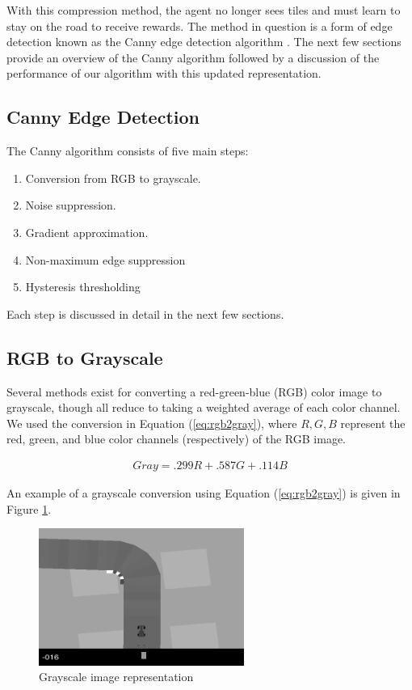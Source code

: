 With this compression method, the
agent no longer sees tiles and must learn to stay on the road to receive rewards.
The method in question is a form of edge detection known as the Canny edge 
detection algorithm \cite{canny}. The next few sections provide an overview
of the Canny algorithm followed by a discussion of the 
performance of our
algorithm with this updated representation.

\newpage
\subsection{Canny Edge Detection}
The Canny algorithm consists of five main steps:

\begin{enumerate}[1.]
\item{Conversion from RGB to grayscale.}
\item{Noise suppression.}
\item{Gradient approximation.}
\item{Non-maximum edge suppression}
\item{Hysteresis thresholding}
\end{enumerate}

Each step is discussed in detail in the next few sections.

\subsection{RGB to Grayscale}
Several methods exist for converting a
red-green-blue (RGB) color image to grayscale, though
all reduce to taking a weighted average of each color channel. We used the 
conversion in Equation (\ref{eq:rgb2gray}), where $R,G,B$ represent the
red, green, and blue color channels (respectively) of the RGB image. 

\begin{align}\label{eq:rgb2gray}
Gray = .299R + .587G + .114B
\end{align}

An example of a grayscale conversion using Equation (\ref{eq:rgb2gray}) is given in 
Figure \ref{fig:rgb_to_grayscale}.

\begin{figure}[h]
\centering
\includegraphics[width=0.6\textwidth]{Graphics/standard_gray_1.png}
\caption{Grayscale image representation}
\label{fig:rgb_to_grayscale}
\end{figure}

